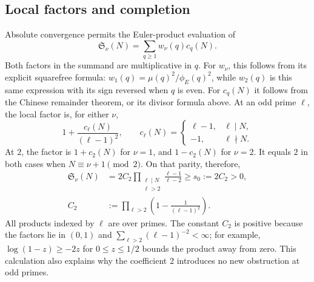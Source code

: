 \documentclass[11pt,letterpaper]{article}
\numberwithin{equation}{section}
\theoremstyle{definition}
\theoremstyle{remark}
\newcommand{\tot}{\phi_{\!E}}
\begin{document}
\subsection{Local factors and completion}

Absolute convergence permits the Euler-product evaluation of
\[
 \mathfrak S_\nu(N)=\sum_{q\ge1}w_\nu(q)c_q(N).
\]
Both factors in the summand are multiplicative in $q$.
For $w_\nu$, this follows from its explicit squarefree formula:
$w_1(q)=\mu(q)^2/\tot(q)^2$, while $w_2(q)$ is this same expression
with its sign reversed when $q$ is even. For $c_q(N)$ it follows
from the Chinese remainder theorem, or its divisor formula above.
At an odd prime $\ell$, the local factor is, for either $\nu$,
\[
 1+\frac{c_\ell(N)}{(\ell-1)^2},\qquad
 c_\ell(N)=
 \begin{cases}
 \ell-1,&\ell\mid N,\\
 -1,&\ell\nmid N.
 \end{cases}
\]
At $2$, the factor is $1+c_2(N)$ for $\nu=1$, and $1-c_2(N)$
for $\nu=2$. It equals $2$ in both cases when
$N\equiv\nu+1\pmod2$. On that parity, therefore,
\begin{equation}\label{app:singular-positive}
 \begin{aligned}
 \mathfrak S_\nu(N)
 &=2C_2\prod_{\substack{\ell\mid N\\\ell>2}}
                 \frac{\ell-1}{\ell-2}
 \ge s_0:=2C_2>0,\\
 C_2&:=\prod_{\ell>2}\left(1-\frac1{(\ell-1)^2}\right).
 \end{aligned}
\end{equation}
All products indexed by $\ell$ are over primes.
The constant $C_2$ is positive because the factors lie in $(0,1)$
and $\sum_{\ell>2}(\ell-1)^{-2}<\infty$; for example,
$\log(1-z)\ge-2z$ for $0\le z\le1/2$ bounds the product away
from zero. This calculation also explains why the coefficient $2$
introduces no new obstruction at odd primes.
\end{document}

